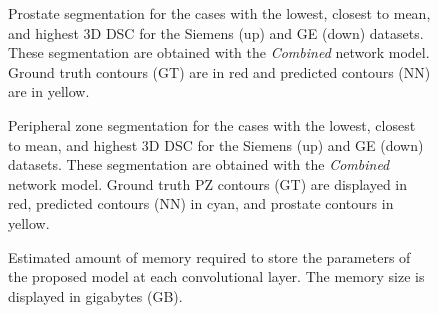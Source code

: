\begin{figure}[ht]
    \centering
    \caption{Prostate segmentation for the cases with the lowest, closest to mean, and highest 3D DSC for the Siemens (up) and GE (down) datasets. These segmentation are obtained with the \emph{Combined} network model. Ground
    truth contours (GT) are in red and predicted  contours  (NN) are in yellow. }
    \label{fig:resseg}
\end{figure} 

\begin{figure}[ht]
    \centering
    \caption{Peripheral zone segmentation for the cases with the lowest, closest to mean, and highest 3D DSC for the Siemens (up) and GE (down) datasets. These segmentation are obtained with the \emph{Combined} network model. 
    Ground truth PZ contours (GT) are displayed in red, predicted  contours (NN) in cyan, and prostate contours in yellow.
    }
    \label{fig:ressegpz}
\end{figure} 

\begin{figure*}[ht]
    \centering
    \caption{Estimated amount of memory required to store the parameters of the proposed model at each convolutional layer. The memory size is displayed in gigabytes (GB). }
    \label{fig:nn_size}
\end{figure*}
